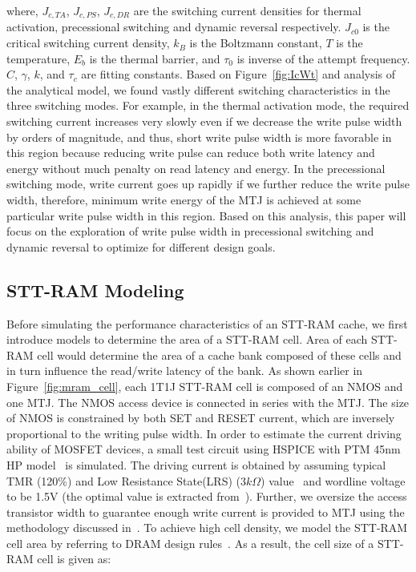 where, $J_{c,TA}$, $J_{c,PS}$, $J_{c,DR}$ are the switching current densities for thermal activation,
precessional switching and dynamic reversal respectively. $J_{c0}$ is the critical switching current
density, $k_{B}$ is the Boltzmann constant, $T$ is the temperature, $E_{b}$ is the thermal barrier,
and $\tau_{0}$ is inverse of the attempt frequency. $C$, $\gamma$, $k$, and $\tau_{c}$ are fitting
constants. Based on Figure~\ref{fig:IcWt} and analysis of the analytical model, we found vastly
different switching characteristics in the three switching modes. For example, in the thermal
activation mode, the required switching current increases very slowly even if we decrease the write
pulse width by orders of magnitude, and thus, short write pulse width is more favorable in this
region because reducing write pulse can reduce both write latency and energy without much penalty on
read latency and energy. In the precessional switching mode, write current goes up rapidly if we
further reduce the write pulse width, therefore, minimum write energy of the MTJ is achieved at some
particular write pulse width in this region. Based on this analysis, this paper will focus on the
exploration of write pulse width in precessional switching and dynamic reversal to optimize for
different design goals.

\subsection{STT-RAM Modeling}

Before simulating the performance characteristics of an STT-RAM cache, we first introduce models to
determine the area of a STT-RAM cell. Area of each STT-RAM cell would determine the area of a cache
bank composed of these cells and in turn influence the read/write latency of the bank. As shown
earlier in Figure~\ref{fig:mram_cell}, each 1T1J STT-RAM cell is composed of an NMOS and one MTJ. The
NMOS access device is connected in series with the MTJ. The size of NMOS is constrained by both SET
and RESET current, which are inversely proportional to the writing pulse width. In order to estimate
the current driving ability of MOSFET devices, a small test circuit using HSPICE with PTM 45nm HP
model~\cite{PTM} is simulated. The driving current is obtained by assuming typical TMR (120\%) and
Low Resistance State(LRS) ($3k\Omega$) value~\cite{STTRAM:Qualcomm09} and wordline voltage to be 1.5V (the optimal value is
extracted from~\cite{STTRAM:Gatech10}). Further, we oversize the access transistor width to guarantee
enough write current is provided to MTJ using the methodology discussed in~\cite{STTRAM:RPI10}. To
achieve high cell density, we model the STT-RAM cell area by referring to DRAM design
rules~\cite{DRAM:6F2}.  As a result, the cell size of a STT-RAM cell is given as:

